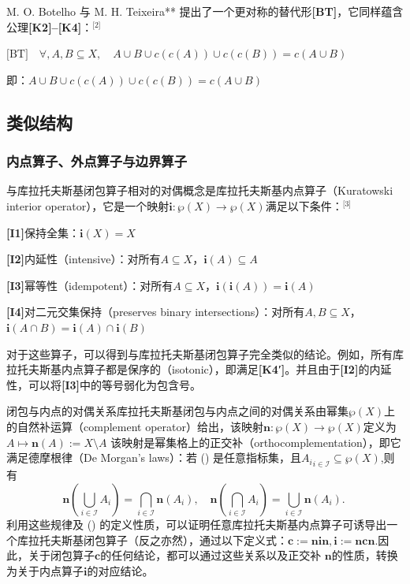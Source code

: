 M. O. Botelho 与 M. H. Teixeira** 提出了一个更对称的替代形\textbf{[BT]}，它同样蕴含公理\textbf{[K2]–[K4]}：\(^\text{[2]}\)

$\text{[BT]}\quad \forall, A,B \subseteq X, \quad A \cup B \cup c(c(A)) \cup c(c(B)) = c(A \cup B)$

即：$A \cup B \cup c(c(A)) \cup c(c(B)) = c(A \cup B)$
\subsection{类似结构}
\subsubsection{内点算子、外点算子与边界算子}
与库拉托夫斯基闭包算子相对的对偶概念是库拉托夫斯基内点算子（Kuratowski interior operator），它是一个映射$\mathbf{i} : \wp(X) \to \wp(X)$满足以下条件：\(^\text{[3]}\)

\textbf{[I1]}保持全集：$\mathbf{i}(X) = X$

\textbf{[I2]}内延性（intensive）：对所有$A \subseteq X $，$\mathbf{i}(A) \subseteq A$

\textbf{[I3]}幂等性（idempotent）：对所有$A \subseteq X $，$
\mathbf{i}(\mathbf{i}(A)) = \mathbf{i}(A)$

\textbf{[I4]}对二元交集保持（preserves binary intersections）：对所有$A, B \subseteq X $，$\mathbf{i}(A \cap B) = \mathbf{i}(A) \cap \mathbf{i}(B)$

对于这些算子，可以得到与库拉托夫斯基闭包算子完全类似的结论。例如，所有库拉托夫斯基内点算子都是保序的（isotonic），即满足\textbf{[K4′]}。并且由于\textbf{[I2]}的内延性，可以将\textbf{[I3]}中的等号弱化为包含号。

闭包与内点的对偶关系库拉托夫斯基闭包与内点之间的对偶关系由幂集$\wp(X)$上的自然补运算（complement operator）给出，该映射$\mathbf{n} : \wp(X) \to \wp(X)$定义为$A \mapsto \mathbf{n}(A) := X \setminus A$
该映射是幂集格上的正交补（orthocomplementation），即它满足德摩根律（De Morgan’s laws）：若 () 是任意指标集，且${A_i}_{i \in \mathcal{I}} \subseteq \wp(X)$,则有
$$
\mathbf{n}\left( \bigcup_{i \in \mathcal{I}} A_i \right) = \bigcap_{i \in \mathcal{I}} \mathbf{n}(A_i),
\quad
\mathbf{n}\left( \bigcap_{i \in \mathcal{I}} A_i \right) = \bigcup_{i \in \mathcal{I}} \mathbf{n}(A_i).~
$$
利用这些规律及 () 的定义性质，可以证明任意库拉托夫斯基内点算子可诱导出一个库拉托夫斯基闭包算子（反之亦然），通过以下定义式：$\mathbf{c} := \mathbf{n i n},\mathbf{i} := \mathbf{n c n}$.因此，关于闭包算子$\mathbf{c}$的任何结论，都可以通过这些关系以及正交补 $\mathbf{n}$的性质，转换为关于内点算子$\mathbf{i}$的对应结论。

